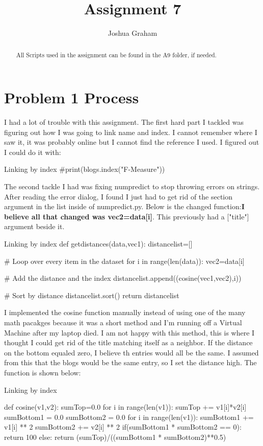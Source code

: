 \documentclass[11pt]{report}
\begin{document}
\title{Assignment 7}
\author{Joshua Graham}

\maketitle
\pagebreak
\begin{abstract}
All Scripts used in the assignment can be found in the A9 folder, if needed.

\end{abstract}
\section{Problem 1 Process}
	I had a lot of trouble with this assignment. The first hard part I tackled was figuring out how I was going to link name and index. I cannot remember where I saw it, it was probably online but I cannot find the reference I used. I figured out I could do it with:
\begin{mylisting}{Linking by index}
#print(blogs.index("F-Measure"))
\end{mylisting}

The second tackle I had was fixing numpredict to stop throwing errors on strings. After reading the error dialog, I found I just had to get rid of the section argument in the list inside of numpredict.py. Below is the changed function:\textbf{I believe all that changed was vec2=data[i]}. This previously had a ["title"] argument beside it.
\begin{mylisting}{Linking by index}
def getdistances(data,vec1):
  distancelist=[]

  # Loop over every item in the dataset
  for i in range(len(data)):
    vec2=data[i]

    # Add the distance and the index
    distancelist.append((cosine(vec1,vec2),i))

  # Sort by distance
  distancelist.sort()
  return distancelist

\end{mylisting}

I implemented the cosine function manually instead of using one of the many math pacakges because it was a short method and I'm running off a Virtual Machine after my laptop died. I am not happy with this method, this is where I thought I could get rid of the title matching itself as a neighbor. If the distance on the bottom equaled zero, I believe th entries would all be the same. I assumed from this that the blogs would be the same entry, so I set the distance high. The function is shown below:
\begin{mylisting}{Linking by index}

def cosine(v1,v2):
    sumTop=0.0
    for i in range(len(v1)):
        sumTop += v1[i]*v2[i]
    sumBottom1 = 0.0
    sumBottom2 = 0.0
    for i in range(len(v1)):
        sumBottom1 += v1[i] ** 2
        sumBottom2 += v2[i] ** 2
    if(sumBottom1 * sumBottom2 == 0):
        return 100
    else:
        return (sumTop)/((sumBottom1 * sumBottom2)**0.5)
\end{mylisting}
\end{document}
